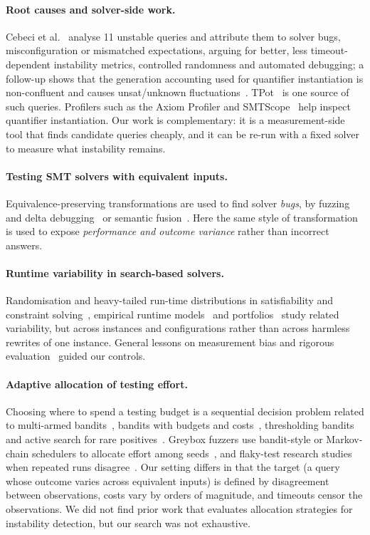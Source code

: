 \documentclass[11pt]{article}
\newcommand{\unsat}{\textsf{unsat}}
\newcommand{\unknown}{\textsf{unknown}}
\begin{document}
\paragraph{Root causes and solver-side work.}
Cebeci et al.~\cite{conjecture} analyse 11 unstable queries and attribute them to solver bugs, misconfiguration or mismatched expectations, arguing for better, less timeout-dependent instability metrics, controlled randomness and automated debugging; a follow-up shows that the generation accounting used for quantifier instantiation is non-confluent and causes \unsat/\unknown{} fluctuations~\cite{depth}. TPot~\cite{tpot} is one source of such queries. Profilers such as the Axiom Profiler and SMTScope~\cite{axiom,smtscope} help inspect quantifier instantiation. Our work is complementary: it is a measurement-side tool that finds candidate queries cheaply, and it can be re-run with a fixed solver to measure what instability remains.

\paragraph{Testing SMT solvers with equivalent inputs.}
Equivalence-preserving transformations are used to find solver \emph{bugs}, by fuzzing and delta debugging~\cite{fuzzsmt} or semantic fusion~\cite{fusion}. Here the same style of transformation is used to expose \emph{performance and outcome variance} rather than incorrect answers.

\paragraph{Runtime variability in search-based solvers.}
Randomisation and heavy-tailed run-time distributions in satisfiability and constraint solving~\cite{heavy}, empirical runtime models~\cite{hutter} and portfolios~\cite{satzilla} study related variability, but across instances and configurations rather than across harmless rewrites of one instance. General lessons on measurement bias and rigorous evaluation~\cite{mytkowicz,georges} guided our controls.

\paragraph{Adaptive allocation of testing effort.}
Choosing where to spend a testing budget is a sequential decision problem related to multi-armed bandits~\cite{thompson,lai,auer}, bandits with budgets and costs~\cite{bwk,ding}, thresholding bandits~\cite{thresh} and active search for rare positives~\cite{activesearch}. Greybox fuzzers use bandit-style or Markov-chain schedulers to allocate effort among seeds~\cite{aflfast,ecofuzz}, and flaky-test research studies when repeated runs disagree~\cite{flaky}. Our setting differs in that the target (a query whose outcome varies across equivalent inputs) is defined by disagreement between observations, costs vary by orders of magnitude, and timeouts censor the observations. We did not find prior work that evaluates allocation strategies for instability detection, but our search was not exhaustive.
\end{document}
